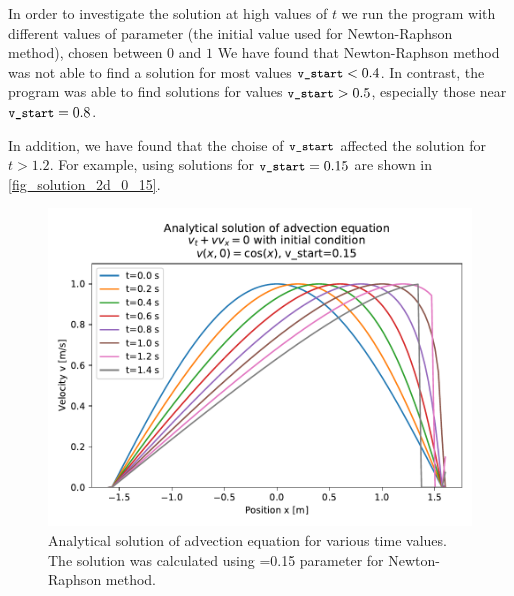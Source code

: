 In order to investigate the solution at high values of $t$ we run the program with different values of  parameter (the initial value used for Newton-Raphson method), chosen between $0$ and $1$ We have found that Newton-Raphson method was not able to find a solution for most values $\texttt{\small v\_start} < 0.4$. In contrast, the program was able to find solutions for values $\texttt{\small v\_start} > 0.5$, especially those near $\texttt{\small v\_start} = 0.8$.

In addition, we have found that the choise of $\texttt{\small v\_start}$ affected the solution for $t > 1.2$. For example, using solutions for $\texttt{\small v\_start}=0.15$ are shown in \autoref{fig_solution_2d_0_15}.
\begin{figure}[H]
  \centering
  \includegraphics[width=1.0\textwidth]{figures/advection_analytical_solution_2d_vstart_0_15.pdf}
  \caption{Analytical solution of advection equation for various time values. The solution was calculated using =0.15 parameter for Newton-Raphson method.}
  \label{fig_solution_2d_0_15}
\end{figure}